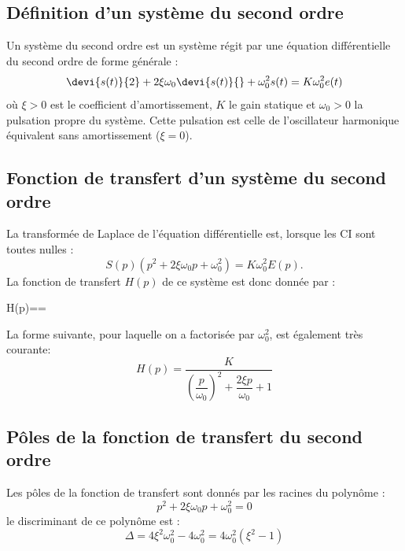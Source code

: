\subsection{Définition d'un système du second ordre}
Un système du second ordre est un système régit par une équation 
différentielle du second ordre de forme générale :
$$
\devi{s(t)}{2}+2\xi\omega_0\devi{s(t)}{}+\omega^2_0s(t)=K\omega^2_0e(t)
$$
où $\xi>0$ est le coefficient d'amortissement, $K$ le gain statique et 
$\omega_0>0$ la pulsation propre du système. Cette pulsation est celle de 
l'oscillateur harmonique équivalent sans amortissement ($\xi=0$).

\subsection{Fonction de transfert d'un système du second ordre}
La transformée de Laplace de l'équation différentielle est, lorsque les CI 
sont toutes nulles :
$$
S(p)\left(p^2+2\xi\omega_0p+\omega^2_0\right)=K\omega^2_0E(p).
$$
La fonction de transfert $H(p)$ de ce système est donc donnée par :
\begin{bequation}
    H(p)==
    \label{eq-2nd_ft}
\end{bequation}
La forme suivante, pour laquelle on a factorisée par $\omega^2_0$, est 
également très courante:
$$
H(p)=\dfrac{K}{\left(\dfrac{p}{\omega_0}\right)^2
    +\dfrac{2\xi p}{\omega_0}+1}
$$

\subsection{Pôles de la fonction de transfert du second ordre}
Les pôles de la fonction de transfert sont donnés par les racines du polynôme :
$$
p^2+2\xi\omega_0p+\omega_0^2 = 0
$$
le discriminant de ce polynôme est :
$$
\Delta=4\xi^2\omega^2_0-4\omega_0^2=4\omega_0^2(\xi^2-1)
$$

